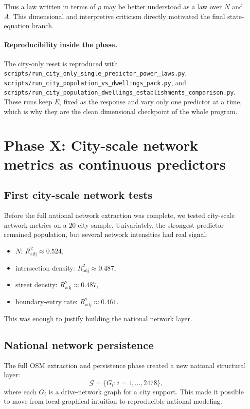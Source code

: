 \documentclass[11pt]{article}
\newcommand{\adjR}{R^2_{\mathrm{adj}}}
\begin{document}
Thus a law written in terms of \(\rho\) may be better understood as a law over \(N\) and \(A\). This dimensional and interpretive criticism directly motivated the final state-equation branch.

\paragraph{Reproducibility inside the phase.}
The city-only reset is reproduced with
\texttt{scripts/run\_city\_only\_single\_predictor\_power\_laws.py},
\texttt{scripts/run\_city\_population\_vs\_dwellings\_pack.py},
and
\texttt{scripts/run\_city\_population\_dwellings\_establishments\_comparison.py}.
These runs keep \(E_i\) fixed as the response and vary only one predictor at a time, which is why they are the clean dimensional checkpoint of the whole program.

\section{Phase X: City-scale network metrics as continuous predictors}

\subsection{First city-scale network tests}

Before the full national network extraction was complete, we tested city-scale network metrics on a \(20\)-city sample. Univariately, the strongest predictor remained population, but several network intensities had real signal:
\begin{itemize}
\item \(N\): \(\adjR \approx 0.524\),
\item intersection density: \(\adjR \approx 0.487\),
\item street density: \(\adjR \approx 0.487\),
\item boundary-entry rate: \(\adjR \approx 0.461\).
\end{itemize}

This was enough to justify building the national network layer.

\subsection{National network persistence}

The full OSM extraction and persistence phase created a new national structural layer:
\begin{equation}
\mathcal{G}
=
\{
G_i : i=1,\dots,2478
\},
\end{equation}
where each \(G_i\) is a drive-network graph for a city support. This made it possible to move from local graphical intuition to reproducible national modeling.
\end{document}
